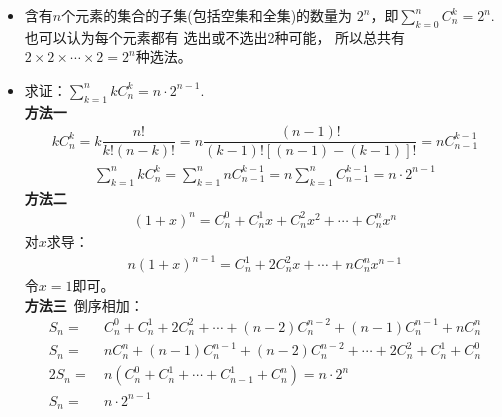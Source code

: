 \begin{itemize}[leftmargin=\inteval{\myitemleftmargin}pt,itemsep=
   \inteval{\myitemitempsep}pt,topsep=\inteval{\myitemtopsep}pt]
\begin{table}[h] 
\caption{组合恒等式} 
\centering
\begin{tabular}{l|l} \label{组合恒等式}
    $\sum\limits_{k=r}^{n} C_k^r=C_{n+1}^{r+1}=C_n^r+C_n^{r+1}$  &		
    $\sum\limits_{k=0}^{r}C_m^kC_n^{r-k}=C_{n+m}^r $     \\
    $\sum\limits_{k=0}^{n} C_n^k=2^{n} $		&
    $\sum\limits_{k=1}^{n} kC_n^k=n\cdot2^{n-1} $  \\
    $\sum\limits_{k=1}^{n} k^2C_n^k=n(n+1)\cdot2^{n-2} $  &
    $\sum\limits_{k=0}^{n} C_{2n}^k=2^{2n-1}+\dfrac{(2n)!}{2(n!)^2} $  \\
    $\sum\limits_{k=0}^{n} \left( C_{n}^k\right) ^2=\dfrac{(2n)!}{(n!)^2} $  &
    $C_n^kC_k^r=C_n^rC_{n-r}^{k-r} $
\end{tabular}
\end{table} 
\item 含有$ n $个元素的集合的子集(包括空集和全集)的数量为
$ 2^n $，即$\sum\limits_{k=0}^{n} C_n^k=2^{n} $. 也可以认为每个元素都有
选出或不选出2种可能，
所以总共有$2\times 2\times \cdots\times 2= 2^n $种选法。

\item 求证：$ \sum\limits_{k=1}^{n} kC_n^k=n\cdot2^{n-1} $. \\
\textbf{方法一} 
\begin{gather*}
    kC_n^k=k\dfrac{n!}{k!(n-k)!}=n\dfrac{(n-1)!}{(k-1)![(n-1)-(k-1)]!}=nC_{n-1}^{k-1} 	
\end{gather*}
\begin{gather*}
    \sum_{k=1}^{n} kC_n^k=\sum_{k=1}^{n} nC_{n-1}^{k-1}=n\sum_{k=1}^{n} C_{n-1}^{k-1}
    =n\cdot 2^{n-1}
\end{gather*}
\textbf{方法二}
\begin{align*}
    (1+x)^n=C_n^0+C_n^1x+C_n^2x^2+\cdots + C_n^nx^n
\end{align*}
对$ x $求导：
\begin{align} \label{二项展开式两边求导}
    n(1+x)^{n-1}=C_n^1+2C_n^2x+\cdots + nC_n^nx^{n-1}
\end{align}
令$ x=1 $即可。\\
\textbf{方法三}\ 倒序相加：
\begin{align*}
    S_n=&\ C_n^0+C_n^1+2C_n^2+\cdots+(n-2)C_n^{n-2} +(n-1)C_n^{n-1}+ nC_n^n \\
    S_n=&\ nC_n^n+(n-1)C_n^{n-1}+(n-2)C_n^{n-2}+\cdots+2C_n^2+ C_n^1 +C_n^0 \\
    2S_n=&\ n(C_n^0+C_n^1+\cdots +C_{n-1}^1+C_n^n)=n\cdot 2^n \\
    S_n=&\  n\cdot 2^{n-1}
\end{align*}


\end{itemize}
